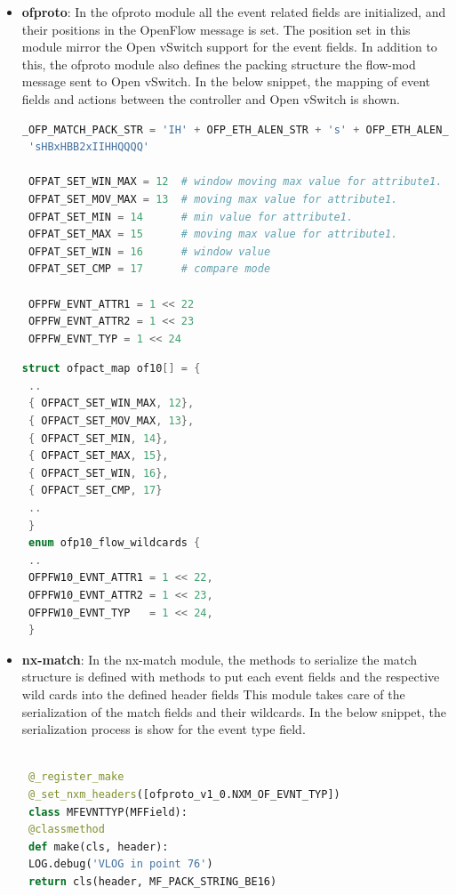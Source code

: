 \begin{itemize}
 \item \textbf{ofproto}: In the ofproto module all the event related fields are initialized, and their positions in the OpenFlow message is set. The position set in this module mirror the Open vSwitch support for the event fields. In addition to this, the ofproto module also defines the packing structure the flow-mod message sent to Open vSwitch. In the below snippet, the mapping of event fields and actions between the controller and Open vSwitch is shown. \newline
 
 \begin{lstlisting}[language=python]
 _OFP_MATCH_PACK_STR = 'IH' + OFP_ETH_ALEN_STR + 's' + OFP_ETH_ALEN_STR + \
 'sHBxHBB2xIIHHQQQQ' 
 
 OFPAT_SET_WIN_MAX = 12  # window moving max value for attribute1.
 OFPAT_SET_MOV_MAX = 13  # moving max value for attribute1.
 OFPAT_SET_MIN = 14      # min value for attribute1.
 OFPAT_SET_MAX = 15      # moving max value for attribute1.
 OFPAT_SET_WIN = 16      # window value
 OFPAT_SET_CMP = 17      # compare mode
 
 OFPFW_EVNT_ATTR1 = 1 << 22
 OFPFW_EVNT_ATTR2 = 1 << 23
 OFPFW_EVNT_TYP = 1 << 24
 \end{lstlisting}
 
 \begin{lstlisting}[language=c]
 struct ofpact_map of10[] = {
 ..
 { OFPACT_SET_WIN_MAX, 12},
 { OFPACT_SET_MOV_MAX, 13},
 { OFPACT_SET_MIN, 14},
 { OFPACT_SET_MAX, 15},
 { OFPACT_SET_WIN, 16},
 { OFPACT_SET_CMP, 17}
 ..
 }
 enum ofp10_flow_wildcards {
 ..
 OFPFW10_EVNT_ATTR1 = 1 << 22,
 OFPFW10_EVNT_ATTR2 = 1 << 23,
 OFPFW10_EVNT_TYP   = 1 << 24,
 } 
 \end{lstlisting}
 \item \textbf{nx-match}: In the nx-match module, the methods to serialize the match structure is defined with methods to put each event fields and the respective wild cards into the defined header fields This module takes care of the serialization of the match fields and their wildcards. In the below snippet, the serialization process is show for the event type field. \newline
 
 \begin{lstlisting}[language=python]

 @_register_make
 @_set_nxm_headers([ofproto_v1_0.NXM_OF_EVNT_TYP])
 class MFEVNTTYP(MFField):
 @classmethod
 def make(cls, header):
 LOG.debug('VLOG in point 76')
 return cls(header, MF_PACK_STRING_BE16)
 

\end{lstlisting}
\end{itemize}
